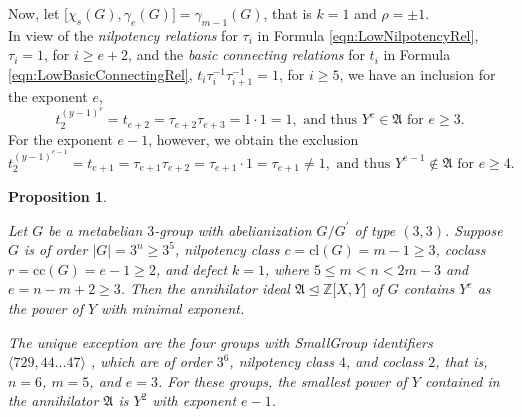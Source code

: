 \documentclass{amsart}
\newtheorem{proposition}{Proposition}[section]
\theoremstyle{definition}
\numberwithin{equation}{section}
\begin{document}
Now, let \(\lbrack\chi_s(G),\gamma_e(G)\rbrack=\gamma_{m-1}(G)\), that is \(k=1\) and \(\rho=\pm 1\).\\
In view of the \textit{nilpotency relations} for \(\tau_i\) in Formula
\eqref{eqn:LowNilpotencyRel},
\(\tau_i=1\), for \(i\ge e+2\),
and the \textit{basic connecting relations} for \(t_i\) in Formula
\eqref{eqn:LowBasicConnectingRel},
\(t_i\tau_i^{-1}\tau_{i+1}^{-1}=1\), for \(i\ge 5\),
we have an inclusion for the exponent \(e\),
\[t_2^{(y-1)^{e}}=t_{e+2}=\tau_{e+2}\tau_{e+3}=1\cdot 1=1, \text{ and thus } Y^{e}\in\mathfrak{A} \text{ for } e\ge 3.\]
For the exponent \(e-1\), however, we obtain the exclusion
\[t_2^{(y-1)^{e-1}}=t_{e+1}=\tau_{e+1}\tau_{e+2}=\tau_{e+1}\cdot 1=\tau_{e+1}\ne 1, \text{ and thus } Y^{e-1}\not\in\mathfrak{A} \text{ for } e\ge 4.\]

\begin{proposition}
\label{prp:LowPowYWithDefect}

Let \(G\) be a metabelian \(3\)-group with abelianization \(G/G^\prime\) of type \((3,3)\).
Suppose \(G\) is of order \(\lvert G\rvert=3^n\ge 3^5\), nilpotency class \(c=\mathrm{cl}(G)=m-1\ge 3\), coclass \(r=\mathrm{cc}(G)=e-1\ge 2\),
and defect \(k=1\), where \(5\le m<n<2m-3\) and \(e=n-m+2\ge 3\).
Then the annihilator ideal \(\mathfrak{A}\unlhd\mathbb{Z}\lbrack X,Y\rbrack\) of \(G\)
contains \(Y^{e}\) as the power of \(Y\) with minimal exponent.

The unique exception are the four groups with SmallGroup identifiers \(\langle 729,44\ldots 47\rangle\)
\cite{BEO1,BEO2},
which are of order \(3^6\), nilpotency class \(4\), and coclass \(2\),
that is, \(n=6\), \(m=5\), and \(e=3\).
For these groups, the smallest power of \(Y\) contained in the annihilator \(\mathfrak{A}\) is \(Y^2\) with exponent \(e-1\).
\end{proposition}
\end{document}

